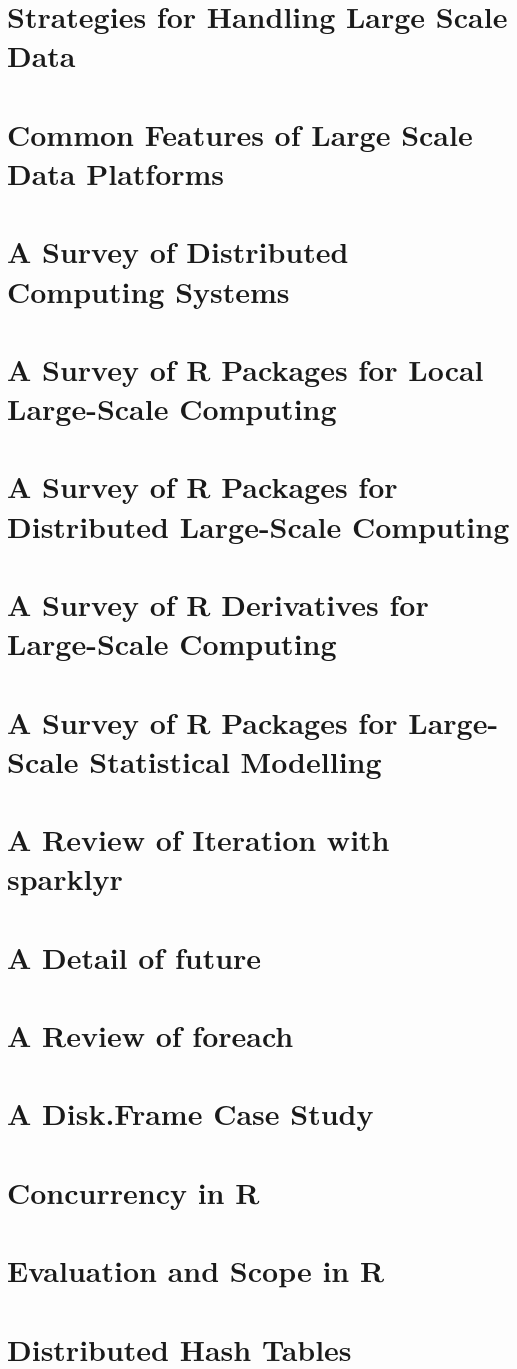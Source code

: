 
\section{Strategies for Handling Large Scale Data}

\section{Common Features of Large Scale Data Platforms}

\section{A Survey of Distributed Computing Systems}

\section{A Survey of R Packages for Local Large-Scale Computing}

\section{A Survey of R Packages for Distributed Large-Scale Computing}

\section{A Survey of R Derivatives for Large-Scale Computing}

\section{A Survey of R Packages for Large-Scale Statistical Modelling}

\section{A Review of Iteration with sparklyr}

\section{A Detail of future}

\section{A Review of foreach}

\section{A Disk.Frame Case Study}

\section{Concurrency in R}

\section{Evaluation and Scope in R}

\section{Distributed Hash Tables}

